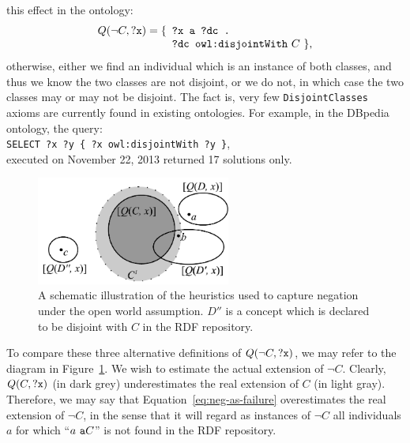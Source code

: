 \documentclass[conference]{IEEEtran}
\begin{document}
this effect in the ontology:
\begin{equation}\label{eq:negation-with-disjointWith}
  Q(\neg C, \mbox{\tt ?x}) =
  \begin{minipage}[t]{3in}
    \begin{tabbing}
      \quad\=\quad\=\quad\=\kill
      \{\>\texttt{?x a ?dc .}\\
        \>\texttt{?dc owl:disjointWith} $C$ \},
    \end{tabbing}
  \end{minipage}
\end{equation}
otherwise, either we find an individual which is an instance of both classes,
and thus we know the two classes are not disjoint, or we do not,
in which case the two classes may or may not be disjoint.
The fact is, very few \texttt{DisjointClasses} axioms are currently found in existing
ontologies. For example, in the DBpedia ontology, the query:\\
\texttt{SELECT ?x ?y \{ ?x owl:disjointWith ?y \}},\\ executed on November 22, 2013
returned 17 solutions only.

\begin{figure}[t!]
  \begin{center}
    \includegraphics[height=1.4in]{../negation}
  \end{center}
  \caption{A schematic illustration of the heuristics used to capture negation
    under the open world assumption. $D''$ is a concept which is declared to
    be disjoint with $C$ in the RDF repository.\label{fig:negation}}
\end{figure}

To compare these three alternative definitions of $Q(\neg C, \mbox{\tt ?x})$,
we may refer to the diagram in Figure~\ref{fig:negation}. We wish to estimate
the actual extension of $\neg C$. Clearly, $Q(C, \mbox{\tt ?x})$
(in dark grey) underestimates the real extension of $C$ (in light gray).
Therefore, we may say that Equation~\ref{eq:neg-as-failure} overestimates
the real extension of $\neg C$,
in the sense that it will regard as instances of $\neg C$ all individuals $a$
for which ``$a \mbox{\tt\ a } C$'' is not found in the RDF repository.
\end{document}

